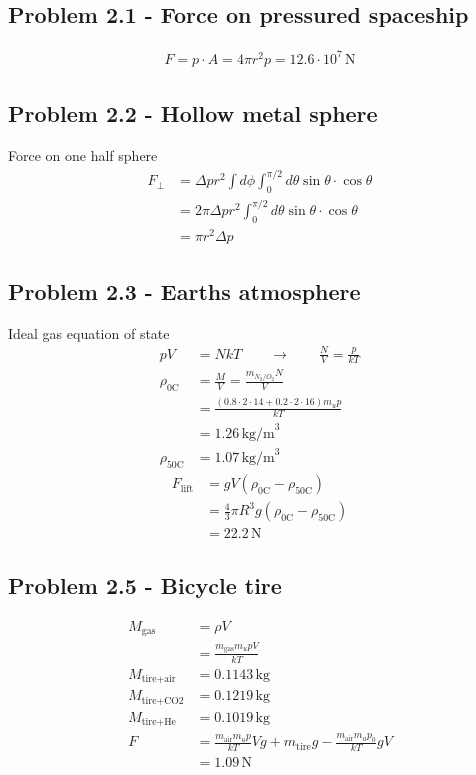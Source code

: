 \documentclass[10pt,a4paper]{book}
\theoremstyle{definition}
\begin{document}
\subsection{Problem 2.1 - Force on pressured spaceship }
\begin{align}
F=p\cdot A=4\pi r^2 p=12.6\cdot 10^7\,\text{N}
\end{align}

\subsection{Problem 2.2 - Hollow metal sphere}
Force on one half sphere
\begin{align}
F_\perp
&=\Delta pr^2\int d\phi\int_0^{\pi/2} d\theta\sin\theta\cdot\cos\theta\\
&=2\pi \Delta pr^2\int_0^{\pi/2} d\theta\sin\theta\cdot\cos\theta\\
&=\pi r^2 \Delta p
\end{align}

\subsection{Problem 2.3 - Earths atmosphere}
Ideal gas equation of state
\begin{align}
pV&=NkT\qquad\rightarrow\qquad\frac{N}{V}=\frac{p}{kT}\\
\rho_\text{0C}&=\frac{M}{V}=\frac{m_{N_2/O_2}N}{V}\\
&=\frac{(0.8\cdot2\cdot14+0.2\cdot2\cdot16)m_u p}{kT}\\
&=1.26\,\text{kg/m}^3\\
\rho_\text{50C}&=1.07\,\text{kg/m}^3
\end{align}
\begin{align}
F_\text{lift}&=gV(\rho_\text{0C}-\rho_\text{50C})\\
&=\frac{4}{3}\pi R^3g(\rho_\text{0C}-\rho_\text{50C})\\
&=22.2\,\text{N}
\end{align}

\subsection{Problem 2.5 - Bicycle tire}
\begin{align}
M_\text{gas}
&=\rho V\\
&=\frac{m_\text{gas}m_u pV}{kT}\\
M_\text{tire+air}&=0.1143\,\text{kg}\\
M_\text{tire+CO2}&=0.1219\,\text{kg}\\
M_\text{tire+He}&=0.1019\,\text{kg}\\
F&=\frac{m_\text{air}m_u p}{kT}Vg+m_\text{tire}g-\frac{m_\text{air}m_u p_0}{kT}gV\\
&=1.09\,\text{N}
\end{align}
\end{document}
